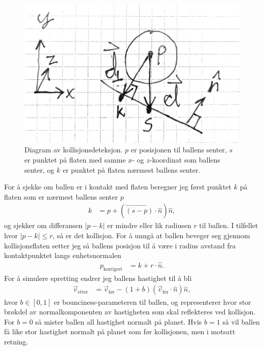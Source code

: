 \documentclass[norsk, doc, 11pt, a4paper]{apa7}  %
\begin{document}
\begin{figure}[H]
	\centering
	\label{fig:kollisjon}
	\includegraphics[scale=0.25]{figs/kollisjon.pdf}
	\caption{Diagram av kollisjonsdeteksjon. \(p\) er posisjonen til ballens senter, \(s\) er punktet på flaten med samme \(x\)- og \(z\)-koordinat som ballens senter, og \(k\) er punktet på flaten nærmest ballens senter.}
\end{figure}

For å sjekke om ballen er i kontakt med flaten beregner jeg først punktet \(k\) på flaten som er nærmest ballens senter \(p\)
\begin{align*}
	k &= p + \left(\vec{(s-p)}\cdot\hat{n}\right)\hat{n},
\end{align*}
og sjekker om differansen \(|p - k|\) er mindre eller lik radiusen \(r\) til ballen. I tilfellet hvor \(|p-k|\leq r\), så er det kollisjon. For å unngå at ballen beveger seg gjennom kollisjonsflaten setter jeg så ballens posisjon til å være i radius avstand fra kontaktpunktet langs enhetsnormalen
\begin{align*}
	p_{\text{korrigert}} &= k + r\cdot\hat{n}.
\end{align*}
For å simulere spretting endrer jeg ballens hastighet til å bli
\begin{align*}
	\vec{v}_{\text{etter}} &= \vec{v}_{\text{før}} - \left(1+b\right)\left(\vec{v}_{\text{før}}\cdot\hat{n}\right)\hat{n},
\end{align*}
hvor \(b\in [0,1]\) er bounciness-parameteren til ballen, og representerer hvor stor brøkdel av normalkomponenten av hastigheten som skal reflekteres ved kollisjon. For \(b = 0\) så mister ballen all hastighet normalt på planet. Hvis \(b=1\) så vil ballen få like stor hastighet normalt på planet som før kollisjonen, men i motsatt retning.
\end{document}
